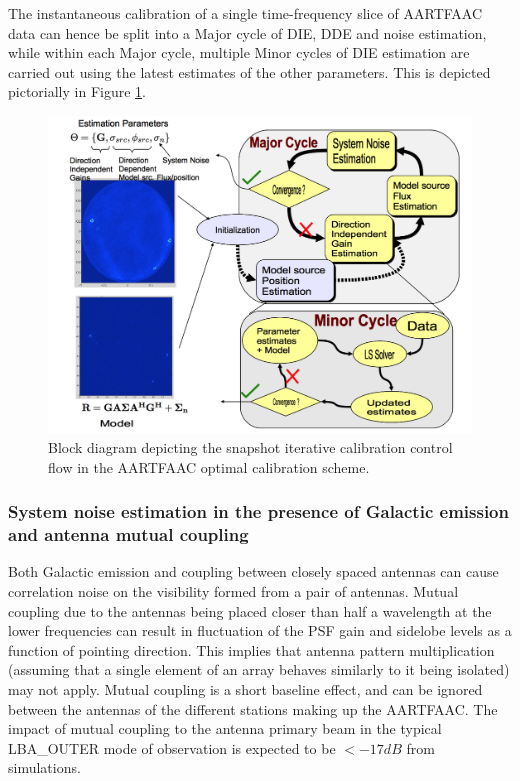 \documentclass{aa}
\begin{document}
The instantaneous calibration of a  single time-frequency slice of AARTFAAC data
can hence be  split into a Major  cycle of DIE, DDE and  noise estimation, while
within each Major cycle, multiple Minor cycles of DIE estimation are carried out
using the latest estimates of the other parameters. This is depicted pictorially
in Figure \ref{fig:Block-diagram-depicting}.

\begin{figure}[tbh]
\includegraphics[width=1\columnwidth]{Figs/convergent_cal_blkdia}\caption{\label{fig:Block-diagram-depicting}Block diagram depicting the snapshot
iterative calibration control flow in the AARTFAAC optimal calibration
scheme. }
\end{figure}

\subsubsection{\label{sub:System-noise-estimation}System noise estimation in the
presence of Galactic emission and antenna mutual coupling}

Both Galactic  emission and coupling  between closely spaced antennas  can cause
correlation  noise on  the visibility  formed from  a pair  of  antennas. Mutual
coupling due to  the antennas being placed closer than half  a wavelength at the
lower frequencies can result in fluctuation  of the PSF gain and sidelobe levels
as a function of pointing direction\citep{agrawal1972mutual}.  This implies that
antenna  pattern multiplication  (assuming that  a  single element  of an  array
behaves similarly  to it  being isolated)  may not apply.  Mutual coupling  is a
short baseline effect, and can be  ignored between the antennas of the different
stations making  up the AARTFAAC. The  impact of mutual coupling  to the antenna
primary beam  in the typical  LBA\_OUTER mode of  observation is expected  to be
$<-17dB$ from simulations\citep{wijnholds2011situ}.
\end{document}
